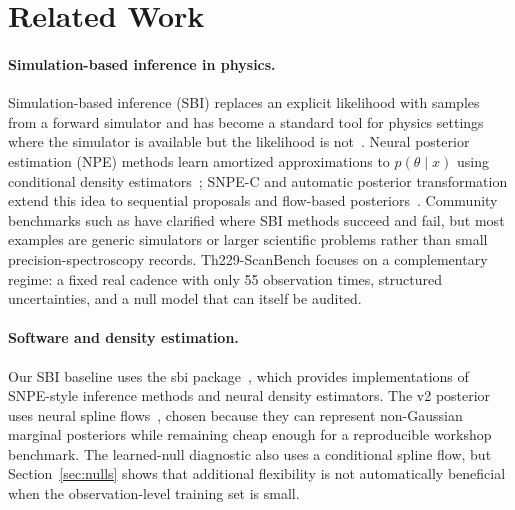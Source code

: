 \documentclass{article}
\newcommand{\thscan}{Th229-ScanBench}
\begin{document}
\section{Related Work}

\paragraph{Simulation-based inference in physics.}
Simulation-based inference (SBI) replaces an explicit likelihood with samples from a forward simulator and has become a standard tool for physics settings where the simulator is available but the likelihood is not~\citep{cranmer2020frontier}.  Neural posterior estimation (NPE) methods learn amortized approximations to \(p(\theta\mid x)\) using conditional density estimators~\citep{papamakarios2016fast}; SNPE-C and automatic posterior transformation extend this idea to sequential proposals and flow-based posteriors~\citep{greenberg2019automatic}.  Community benchmarks such as \citet{lueckmann2021benchmarking} have clarified where SBI methods succeed and fail, but most examples are generic simulators or larger scientific problems rather than small precision-spectroscopy records.  \thscan{} focuses on a complementary regime: a fixed real cadence with only 55 observation times, structured uncertainties, and a null model that can itself be audited.

\paragraph{Software and density estimation.}
Our SBI baseline uses the sbi package~\citep{tejero2020sbi}, which provides implementations of SNPE-style inference methods and neural density estimators.  The v2 posterior uses neural spline flows~\citep{durkan2019neural}, chosen because they can represent non-Gaussian marginal posteriors while remaining cheap enough for a reproducible workshop benchmark.  The learned-null diagnostic also uses a conditional spline flow, but Section~\ref{sec:nulls} shows that additional flexibility is not automatically beneficial when the observation-level training set is small.
\end{document}

